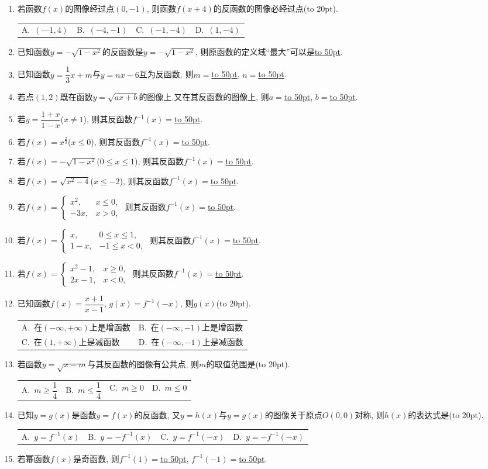 \documentclass[10pt,a4paper]{article}
\newcommand{\blank}[1]{\underline{\hbox to #1pt{}}}
\newcommand{\bracket}[1]{(\hbox to #1pt{})}
\newcommand{\twoch}[4]{\par\begin{tabular}{p{.46\textwidth}p{.46\textwidth}}
A.~#1& B.~#2\\
C.~#3& D.~#4
\end{tabular}}
\newcommand{\fourch}[4]{\par\begin{tabular}{p{.23\textwidth}p{.23\textwidth}p{.23\textwidth}p{.23\textwidth}}
A.~#1 &B.~#2& C.~#3& D.~#4
\end{tabular}}
\begin{document}
\begin{enumerate}[1.]
\fourch{$1$}{$-1$}{$2$}{$-2$}
\item 若函数$f(x)$的图像经过点$(0, -1)$, 则函数$f(x+4)$的反函数的图像必经过点\bracket{20}.
\fourch{$(—1,4)$}{$(-4,-1)$}{$(-1,-4)$}{$(1,-4)$}
\item 已知函数$y=-\sqrt {1-x^2}$的反函数是$y=-\sqrt {1-x^2}$, 则原函数的定义域``最大''可以是\blank{50}.
\item 已知函数$y=\dfrac 13x+m$与$y=nx-6$互为反函数, 则$m=$\blank{50}, $n=$\blank{50}.
\item 若点$(1, 2)$既在函数$y=\sqrt {ax+b}$的图像上.又在其反函数的图像上, 则$a=$\blank{50}, $b=$\blank{50}.
\item 若$y=\dfrac{1+x}{1-x}$($x\ne 1$), 则其反函数$f^{-1}(x)=$\blank{50}.
\item 若$f(x)=x^{\frac 23}$($x\le 0$), 则其反函数$f^{-1}(x)=$\blank{50}.
\item 若$f(x)=-\sqrt {1-x^2}$($0\le x\le 1$), 则其反函数$f^{-1}(x)=$\blank{50}.
\item 若$f(x)=\sqrt {x^2-4}$($x\le -2$), 则其反函数$f^{-1}(x)=$\blank{50}.
\item 若$f(x)=\begin{cases}
   x^2, & x\le 0,  \\ -3x, & x>0,  \end{cases}$ 则其反函数$f^{-1}(x)=$\blank{50}.
\item 若$f(x)=\begin{cases}
   x, & 0\le x\le 1,  \\1-x, & -1\le x<0,  \end{cases}$ 则其反函数$f^{-1}(x)=$\blank{50}.
\item 若$f(x)=\begin{cases}
   x^2-1,  & x\ge 0,  \\2x-1, & x<0,  \end{cases}$ 则其反函数$f^{-1}(x)=$\blank{50}.
\item 已知函数$f(x)=\dfrac{x+1}{x-1}$, $g(x)=f^{-1}(-x)$, 则$g(x)$\bracket{20}.
\twoch{在$(-\infty ,+\infty)$上是增函数}{在$(-\infty ,-1)$上是增函数}{在$(1,+\infty)$上是减函数}{在$(-\infty ,-1)$上是减函数}
\item 若函数$y=\sqrt {x-m}$与其反函数的图像有公共点, 则$m$的取值范围是\bracket{20}.
\fourch{$m\ge \dfrac 14$}{$m\le \dfrac 14$}{$m\ge 0$}{$m\le 0$}
\item 已知$y=g(x)$是函数$y=f(x)$的反函数, 又$y=h(x)$与$y=g(x)$的图像关于原点$O(0,0)$对称, 则$h(x)$的表达式是\bracket{20}.
\fourch{$y=f^{-1}(x)$}{$y=-f^{-1}(x)$}{$y=f^{-1}(-x)$}{$y=-f^{-1}(-x)$}
\item 若幂函数$f(x)$是奇函数, 则$f^{-1}(1)=$\blank{50}, $f^{-1}(-1)=$\blank{50}.

\end{enumerate}
\end{document}
